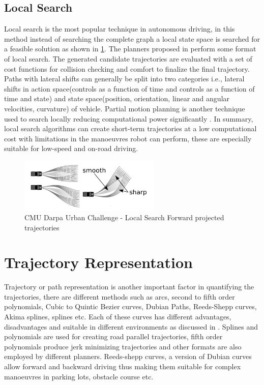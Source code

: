 \subsection{Local Search}
\label{rw_local_search}

Local search is the most popular technique in autonomous driving, in this method instead of searching the complete graph a local state space is searched for a feasible solution as shown in \ref{cmubossduc}. The planners proposed in \cite{darpa_urban_challenge} \cite{juniorstanford} \cite{kolski_thesis} \cite{Broggi2012} \cite{real_time_traj_plan_article} \cite{urbansafetyeth} perform some format of local search. The generated candidate trajectories are evaluated with a set of cost functions for collision checking and comfort to finalize the final trajectory. Paths with lateral shifts can generally be split into two categories i.e., lateral shifts in action space(controls as a function of time and controls as a function of time and state) and state space(position, orientation, linear and angular velocities, curvature) of vehicle\cite{howard_phd}. Partial motion planning is another technique used to search locally reducing computational power significantly \cite{partialmotionplanning}. In summary, local search algorithms can create short-term trajectories at a low computational cost with limitations in the manoeuvres robot can perform, these are especially suitable for low-speed and on-road driving.

\begin{figure}
	\centering
	\includegraphics[width=0.6\textwidth]{Images/related_work/trajectorysetbossduc.png}
	\caption{CMU Darpa Urban Challenge - Local Search Forward projected trajectories}
	\label{cmubossduc}
\end{figure} 

\section{Trajectory Representation}
\label{trajrep}
Trajectory or path representation is another important factor in quantifying the trajectories, there are different methods such as arcs, second to fifth order polynomials, Cubic to Quintic Bezier curves, Dubian Paths, Reeds-Shepp curves, Akima splines, splines etc. Each of these curves has different advantages, disadvantages and suitable in different environments as discussed in \cite{motion_planning_techniques}. Splines and polynomials are used for creating road parallel trajectories, fifth order polynomials produce jerk minimizing trajectories\cite{werling_frenet} and other formats are also employed by different planners. Reeds-shepp curves, a version of Dubian curves allow forward and backward driving \cite{reedsshepp} thus making them suitable for complex manoeuvres in parking lots, obstacle course etc.


